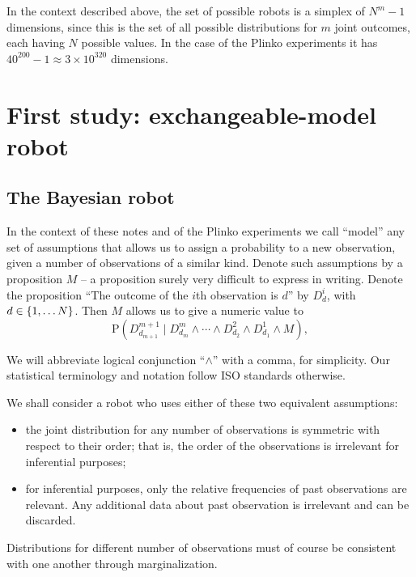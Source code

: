 \documentclass[\ifafour a4paper,12pt,\else a5paper,10pt,\fi%
onecolumn,oneside,article,%
british%
]{memoir}
\theoremstyle{remark}
\theoremstyle{innote}
\newcommand*{\citep}{\parencites}
\DeclarePairedDelimiter\set{\{}{\}}
\newcommand*{\p}{\mathrm{P}}%
\renewcommand*{\|}{\mathpunct{|}}
\begin{document}
In the context described above, the set of possible robots is a simplex of
$N^m-1$ dimensions, since this is the set of all possible distributions for
$m$ joint outcomes, each having $N$ possible values. In the case of the
Plinko experiments it has $40^{200}-1 \approx 3\times10^{320}$ dimensions.






\section{First study: exchangeable-model robot}
\label{sec:first_study}

\subsection{The Bayesian robot}
\label{sec:bayes_robot}

In the context of these notes and of the Plinko experiments
\citep{filipowiczetal2014,filipowiczetal2016} we call \enquote{model} any
set of assumptions that allows us to assign a probability to a new
observation, given a number of observations of a similar kind. Denote such
assumptions by a proposition $M$ -- a proposition surely very difficult to
express in writing. Denote the proposition \enquote{The outcome of the
  $i$th observation is $d$} by $D_{d}^i$, with $d \in \set{1,\dotsc N}$.
Then $M$ allows us to give a numeric value to
\begin{equation}
  \label{eq:general_prediction}
  \p(D^{m+1}_{d_{m+1}} \|
  D^m_{d_m} \land \dotsb \land  D^2_{d_2} \land D^1_{d_1} \land  M),
\end{equation}

We will abbreviate logical conjunction \enquote{$\land$} with a comma, for
simplicity. Our statistical terminology and notation follow ISO standards
\citep{iso1993_r2009,iso2006} otherwise.

We shall consider a robot who uses either of these two equivalent
assumptions:
\begin{itemize}
\item the joint distribution for any number of observations is symmetric with
respect to their order; that is, the order of the observations is
irrelevant for inferential purposes;
\item for inferential purposes, only the relative frequencies of past observations
  are relevant. Any additional data about past observation is irrelevant
  and can be discarded.
\end{itemize}
Distributions for different number of observations must of course be
consistent with one another through marginalization.
\end{document}
